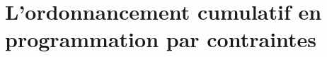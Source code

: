 \chapter[L'ordonnancement cumulatif en PPC]{L'ordonnancement cumulatif en programmation par contraintes}

 
 
